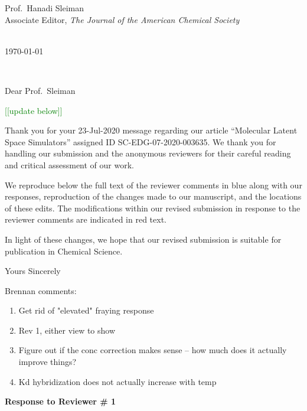\documentclass[11pt,a4paper]{letter} %
\makeatletter
\newcommand*{\noteg}[1]{\textcolor{green}{[[#1]]}}		%
\def\opening#1{\thispagestyle{empty}
{\centering\fromaddress \vspace{1.1in} \\ %
%
\hspace*{4.15 in}\today\hspace*{\fill}\par
} %
{\raggedright \toname \\ \toaddress \par} %
\vspace{0.05in} %
\noindent #1 %
}
\makeatother
\begin{document}

\begin{letter}
{
Prof.\ Hanadi Sleiman \\
Associate Editor, \textit{The Journal of the American Chemical Society}
}


\opening{Dear Prof.\ Sleiman}

\noteg{update below} 

Thank you for your 23-Jul-2020 message regarding our article “Molecular Latent Space Simulators” assigned ID SC-EDG-07-2020-003635. We thank you for handling our submission and the anonymous reviewers for their careful reading and critical assessment of our work.

We reproduce below the full text of the reviewer comments in blue along with our responses, reproduction of the changes made to our manuscript, and the locations of these edits. The modifications within our revised submission in response to the reviewer comments are indicated in red text. 

In light of these changes, we hope that our revised submission is suitable for publication in Chemical Science.

\closing{Yours Sincerely}

\end{letter}


\clearpage
\newpage

Brennan comments:
\begin{enumerate}
    \item Get rid of "elevated" fraying response
    \item Rev 1, either view to show
    \item Figure out if the conc correction makes sense -- how much does it actually improve things?
    \item Kd hybridization does not actually increase with temp
\end{enumerate}

\begin{shaded}
\textbf{Response to Reviewer \# 1}
\end{shaded}
\end{document}
